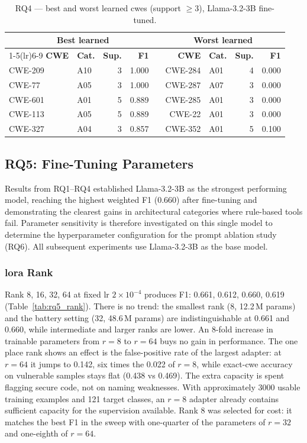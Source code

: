 \begin{table}[H]
\centering
\caption{RQ4 --- best and worst learned \glspl{cwe} (support $\geq 3$), Llama-3.2-3B fine-tuned.}
\label{tab:rq4_cwe}
\footnotesize
\begin{tabular}{l l r r r r l r r}
\toprule
\multicolumn{5}{c}{\textbf{Best learned}} & \multicolumn{4}{c}{\textbf{Worst learned}} \\
\cmidrule(lr){1-5}\cmidrule(lr){6-9}
\textbf{CWE} & \textbf{Cat.} & \textbf{Sup.} & \textbf{F1} & & \textbf{CWE} & \textbf{Cat.} & \textbf{Sup.} & \textbf{F1} \\
\midrule
CWE-209 & A10 & 3 & 1.000 & & CWE-284 & A01 & 4 & 0.000 \\
CWE-77  & A05 & 3 & 1.000 & & CWE-287 & A07 & 3 & 0.000 \\
CWE-601 & A01 & 5 & 0.889 & & CWE-285 & A01 & 3 & 0.000 \\
CWE-113 & A05 & 5 & 0.889 & & CWE-22  & A01 & 3 & 0.000 \\
CWE-327 & A04 & 3 & 0.857 & & CWE-352 & A01 & 5 & 0.100 \\
\bottomrule
\end{tabular}
\end{table}

\subsection{RQ5: Fine-Tuning Parameters}

Results from RQ1--RQ4 established Llama-3.2-3B as the strongest performing model, reaching the highest weighted F1 (0.660) after fine-tuning and demonstrating the clearest gains in architectural categories where rule-based tools fail. Parameter sensitivity is therefore investigated on this single model to determine the hyperparameter configuration for the prompt ablation study (RQ6). All subsequent experiments use Llama-3.2-3B as the base model.

\subsubsection{\gls{lora} Rank}
\label{sec:rq5_rank}

Rank 8, 16, 32, 64 at fixed lr $2\times10^{-4}$ produces F1: 0.661, 0.612, 0.660, 0.619 (Table~\ref{tab:rq5_rank}). There is no trend: the smallest rank (8, 12.2\,M params) and the battery setting (32, 48.6\,M params) are indistinguishable at 0.661 and 0.660, while intermediate and larger ranks are lower. An 8-fold increase in trainable parameters from $r=8$ to $r=64$ buys no gain in performance. The one place rank shows an effect is the false-positive rate of the largest adapter: at $r=64$ it jumps to 0.142, six times the 0.022 of $r=8$, while exact-\gls{cwe} accuracy on vulnerable samples stays flat (0.438 vs 0.469). The extra capacity is spent flagging secure code, not on naming weaknesses. With approximately 3000 usable training examples and 121 target classes, an $r=8$ adapter already contains sufficient capacity for the supervision available. Rank 8 was selected for cost: it matches the best F1 in the sweep with one-quarter of the parameters of $r=32$ and one-eighth of $r=64$.

